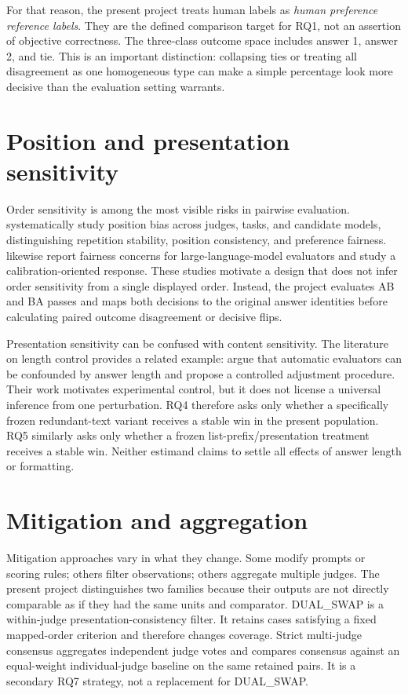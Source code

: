 For that reason, the present project treats human labels as \emph{human preference reference labels}. They are the defined comparison target for RQ1, not an assertion of objective correctness. The three-class outcome space includes answer 1, answer 2, and tie. This is an important distinction: collapsing ties or treating all disagreement as one homogeneous type can make a simple percentage look more decisive than the evaluation setting warrants.

\section{Position and presentation sensitivity}

Order sensitivity is among the most visible risks in pairwise evaluation. \citet{shi2025judging} systematically study position bias across judges, tasks, and candidate models, distinguishing repetition stability, position consistency, and preference fairness. \citet{wang2024fair} likewise report fairness concerns for large-language-model evaluators and study a calibration-oriented response. These studies motivate a design that does not infer order sensitivity from a single displayed order. Instead, the project evaluates AB and BA passes and maps both decisions to the original answer identities before calculating paired outcome disagreement or decisive flips.

Presentation sensitivity can be confused with content sensitivity. The literature on length control provides a related example: \citet{dubois2024length} argue that automatic evaluators can be confounded by answer length and propose a controlled adjustment procedure. Their work motivates experimental control, but it does not license a universal inference from one perturbation. RQ4 therefore asks only whether a specifically frozen redundant-text variant receives a stable win in the present population. RQ5 similarly asks only whether a frozen list-prefix/presentation treatment receives a stable win. Neither estimand claims to settle all effects of answer length or formatting.

\section{Mitigation and aggregation}

Mitigation approaches vary in what they change. Some modify prompts or scoring rules; others filter observations; others aggregate multiple judges. The present project distinguishes two families because their outputs are not directly comparable as if they had the same units and comparator. DUAL\_SWAP is a within-judge presentation-consistency filter. It retains cases satisfying a fixed mapped-order criterion and therefore changes coverage. Strict multi-judge consensus aggregates independent judge votes and compares consensus against an equal-weight individual-judge baseline on the same retained pairs. It is a secondary RQ7 strategy, not a replacement for DUAL\_SWAP.

